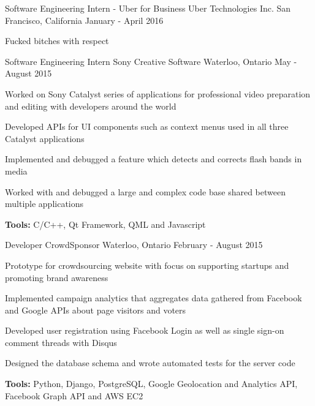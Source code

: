 \begin{cventries}
  \cventry
    {Software Engineering Intern - Uber for Business}
    {Uber Technologies Inc.}
    {San Francisco, California}
    {January - April 2016}
    {
      \begin{cvitems}
      \item Fucked bitches with respect
      \end{cvitems}
    }
  \cventry
    {Software Engineering Intern}
    {Sony Creative Software}
    {Waterloo, Ontario}
    {May - August 2015}
    {
      \begin{cvitems}
        \item Worked on Sony Catalyst series of applications for professional video preparation and editing with developers around the world
        \item Developed APIs for UI components such as context menus used in all three Catalyst applications
        \item Implemented and debugged a feature which detects and corrects flash bands in media
        \item Worked with and debugged a large and complex code base shared between multiple applications
        \item \textbf{Tools:} C/C++, Qt Framework, QML and Javascript
      \end{cvitems}
    }
  \cventry
    {Developer}
    {CrowdSponsor}
    {Waterloo, Ontario}
    {February - August 2015}
    {
      \begin{cvitems}
        \item Prototype for crowdsourcing website with focus on supporting startups and promoting brand awareness
        \item Implemented campaign analytics that aggregates data gathered from Facebook and Google APIs about page visitors and voters
        \item Developed user registration using Facebook Login as well as single sign-on comment threads with Disqus
        \item Designed the database schema and wrote automated tests for the server code
        \item \textbf{Tools:} Python, Django, PostgreSQL, Google Geolocation and Analytics API, Facebook Graph API and AWS EC2
      \end{cvitems}
    }
\end{cventries}
